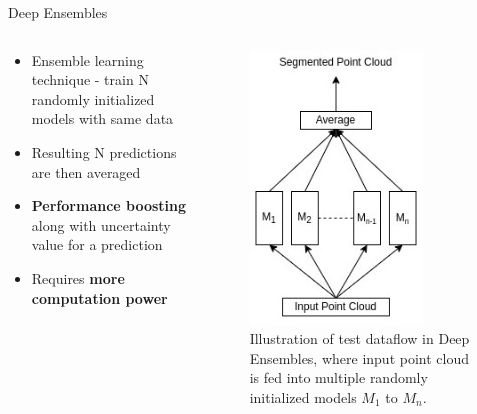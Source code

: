 \documentclass[aspectratio=169]{beamer}
\begin{document}
\begin{frame}{Deep Ensembles}
    \begin{columns}
        \begin{column}{0.5\textwidth}
            \begin{itemize}
                \item Ensemble learning technique - train N randomly initialized models with same data
                \item Resulting N predictions are then averaged
                \item \textbf{Performance boosting} along with uncertainty value for a prediction
                \item Requires \textbf{more computation power}
            \end{itemize}
        \end{column}
        \begin{column}{0.5\textwidth}
            \begin{figure}
                \centering
                \includegraphics[scale=0.5]{images/deep_ensembles.jpg}
                \caption{Illustration of test dataflow in Deep Ensembles, where input point cloud is fed into multiple
                randomly initialized models $M_1$ to $M_n$.}
                \label{fig:deep_ensembles_work}    
            \end{figure}
        \end{column}
    \end{columns}
\end{frame}
\end{document}
